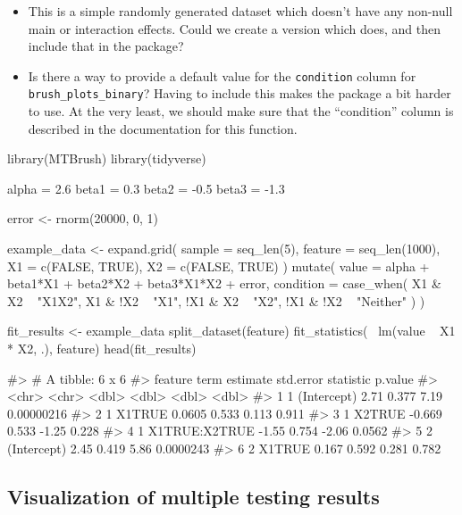 \color{violet}

\begin{itemize}
\tightlist
\item
  This is a simple randomly generated dataset which doesn't have any
  non-null main or interaction effects. Could we create a version which
  does, and then include that in the package?
\item
  Is there a way to provide a default value for the \texttt{condition}
  column for \texttt{brush\_plots\_binary}? Having to include this makes
  the package a bit harder to use. At the very least, we should make
  sure that the ``condition'' column is described in the documentation
  for this function.
\end{itemize}

\begin{Schunk}
\begin{Sinput}
library(MTBrush)
library(tidyverse)

alpha = 2.6
beta1 = 0.3
beta2 = -0.5
beta3 = -1.3

error <- rnorm(20000, 0, 1)

example_data <- expand.grid(
  sample = seq_len(5),
  feature = seq_len(1000),
  X1 = c(FALSE, TRUE),
  X2 = c(FALSE, TRUE)
) %>%
  mutate(
    value = alpha + beta1*X1 + beta2*X2 + beta3*X1*X2 + error,
    condition = case_when( 
      X1 & X2 ~ "X1X2",
      X1 & !X2 ~ "X1",
      !X1 & X2 ~ "X2",
      !X1 & !X2 ~ "Neither"
      )
    )

fit_results <- example_data %>%
  split_dataset(feature) %>%
  fit_statistics(~ lm(value ~ X1 * X2, .), feature)
head(fit_results)
\end{Sinput}
\begin{Soutput}
#> # A tibble: 6 x 6
#>   feature term          estimate std.error statistic    p.value
#>   <chr>   <chr>            <dbl>     <dbl>     <dbl>      <dbl>
#> 1 1       (Intercept)     2.71       0.377     7.19  0.00000216
#> 2 1       X1TRUE          0.0605     0.533     0.113 0.911     
#> 3 1       X2TRUE         -0.669      0.533    -1.25  0.228     
#> 4 1       X1TRUE:X2TRUE  -1.55       0.754    -2.06  0.0562    
#> 5 2       (Intercept)     2.45       0.419     5.86  0.0000243 
#> 6 2       X1TRUE          0.167      0.592     0.281 0.782
\end{Soutput}
\end{Schunk}

\color{black}

\hypertarget{visualization-of-multiple-testing-results}{%
\subsection{Visualization of multiple testing
results}\label{visualization-of-multiple-testing-results}}

